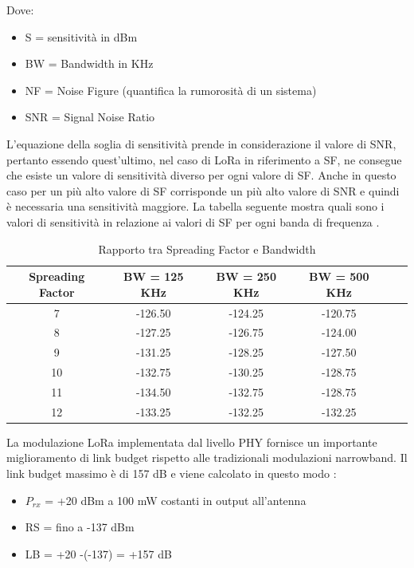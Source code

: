 \documentclass[12pt,a4paper,openright,twoside]{report}
\begin{document}
Dove:
\begin{itemize}                       
\item S = sensitivit\`a in dBm
\item BW = Bandwidth in KHz
\item NF = Noise Figure (quantifica la rumorosit\`a di un sistema)
\item SNR = Signal Noise Ratio
\end{itemize}
L'equazione della soglia di sensitivit\`a prende in considerazione il valore di SNR, pertanto essendo quest'ultimo, nel caso di LoRa in riferimento a SF, ne consegue che esiste un valore di sensitivit\`a diverso per ogni valore di SF. Anche in questo caso per un pi\`u alto valore di SF corrisponde un pi\`u alto valore di SNR e quindi \`e necessaria una sensitivit\`a maggiore. 
La tabella seguente mostra quali sono i valori di sensitivit\`a in relazione ai valori di SF per ogni banda di frequenza \cite{K21}.
\\
\begin{table}
\begin{center}
\begin{tabular}{cccccc}
Spreading Factor&BW = 125 KHz&BW = 250 KHz&BW = 500 KHz\\ \hline\hline
7&-126.50&-124.25&-120.75\\
\hline
8&-127.25&-126.75&-124.00\\
\hline
9&-131.25&-128.25&-127.50\\
\hline
10&-132.75&-130.25&-128.75\\
\hline
11&-134.50&-132.75&-128.75\\
\hline
12&-133.25&-132.25&-132.25\\
\hline
\end{tabular}
\caption[Rapporto tra Spreading Factor e Bandwidth]{Rapporto tra Spreading Factor e Bandwidth}\label{tab:cinque}
\end{center}
\end{table}


La modulazione LoRa implementata dal livello PHY fornisce un importante miglioramento di link budget rispetto alle tradizionali modulazioni narrowband. 
Il link budget massimo \`e di 157 dB e viene calcolato in questo modo \cite{K22} :

\begin{itemize}                       
\item $P_{rx}$ = +20 dBm a 100 mW costanti in output all'antenna
\item RS = fino a -137 dBm
\item LB = +20 -(-137) = +157 dB
\end{itemize}
\end{document}
